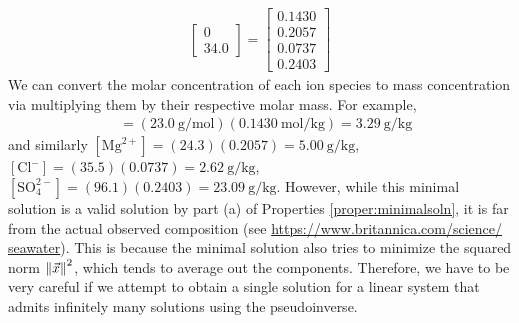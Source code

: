\begin{solution}
\begin{align*}
\begin{bmatrix}
0 \\
34.0
\end{bmatrix}
=
\begin{bmatrix}
0.1430 \\
0.2057 \\
0.0737 \\
0.2403
\end{bmatrix}
\end{align*}
We can convert the molar concentration of each ion species to mass concentration via multiplying them by their respective molar mass. For example,
\begin{align*}
[\text{Na}^+] &= (\SI{23.0}{\g \per \mol})(\SI{0.1430}{\mol \per \kg}) = \SI{3.29}{\g \per \kg}
\end{align*}
and similarly $[\text{Mg}^{2+}] = (24.3)(0.2057) = \SI{5.00}{\g \per \kg}$, $[\text{Cl}^{-}] = (35.5)(0.0737) \allowbreak = \SI{2.62}{\g \per \kg}$, $[\text{SO}_4^{2-}] = (96.1)(0.2403) = \SI{23.09}{\g \per \kg}$. However, while this minimal solution is a valid solution by part (a) of Properties \ref{proper:minimalsoln}, it is far from the actual observed composition (see \href{https://www.britannica.com/science/seawater}{https://www.britannica.com/science/\\seawater}). This is because the minimal solution also tries to minimize the squared norm $\norm{\vec{x}}^2$, which tends to average out the components. Therefore, we have to be very careful if we attempt to obtain a single solution for a linear system that admits infinitely many solutions using the pseudoinverse.
\end{solution}

